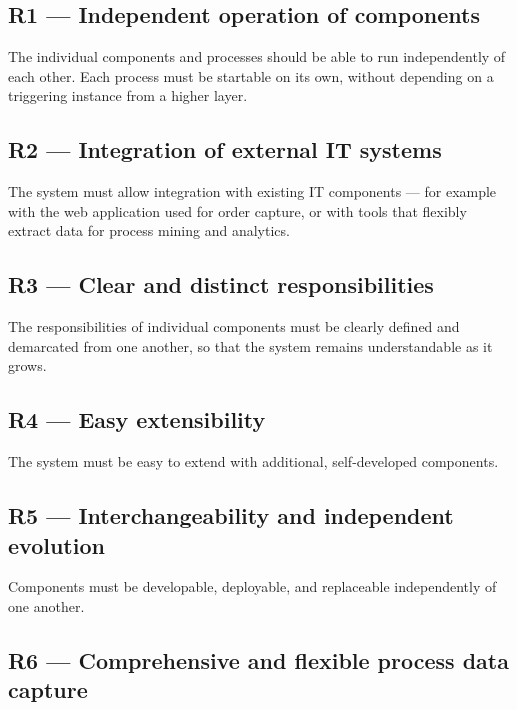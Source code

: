 \documentclass[
  english,
  11pt,
  a4paper,
]{scrbook}
\begin{document}
\subsection{R1 --- Independent operation of
components}\label{r1-independent-operation-of-components}

The individual components and processes should be able to run
independently of each other. Each process must be startable on its own,
without depending on a triggering instance from a higher layer.

\subsection{R2 --- Integration of external IT
systems}\label{r2-integration-of-external-it-systems}

The system must allow integration with existing IT components --- for
example with the web application used for order capture, or with tools
that flexibly extract data for process mining and analytics.

\subsection{R3 --- Clear and distinct
responsibilities}\label{r3-clear-and-distinct-responsibilities}

The responsibilities of individual components must be clearly defined
and demarcated from one another, so that the system remains
understandable as it grows.

\subsection{R4 --- Easy extensibility}\label{r4-easy-extensibility}

The system must be easy to extend with additional, self-developed
components.

\subsection{R5 --- Interchangeability and independent
evolution}\label{r5-interchangeability-and-independent-evolution}

Components must be developable, deployable, and replaceable
independently of one another.

\subsection{R6 --- Comprehensive and flexible process data
capture}\label{r6-comprehensive-and-flexible-process-data-capture}
\end{document}
